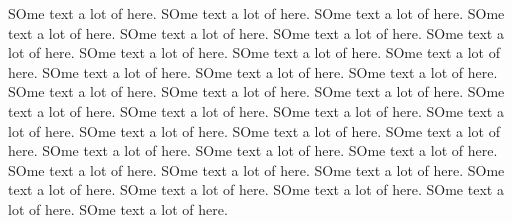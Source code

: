 \documentclass[a4paper]{article}
\begin{document}
    SOme text a lot of here.
    SOme text a lot of here.
    SOme text a lot of here.
    SOme text a lot of here.
    SOme text a lot of here.
    SOme text a lot of here.
    SOme text a lot of here.
    SOme text a lot of here.
    SOme text a lot of here.
    SOme text a lot of here.
    SOme text a lot of here.
    SOme text a lot of here.
    SOme text a lot of here.
    SOme text a lot of here.
    SOme text a lot of here.
    SOme text a lot of here.
    SOme text a lot of here.
    SOme text a lot of here.
    SOme text a lot of here.
    SOme text a lot of here.
    SOme text a lot of here.
    SOme text a lot of here.
    SOme text a lot of here.
    SOme text a lot of here.
    SOme text a lot of here.
    SOme text a lot of here.
    SOme text a lot of here.
    SOme text a lot of here.
    SOme text a lot of here.
    SOme text a lot of here.
    SOme text a lot of here.
    SOme text a lot of here.
    SOme text a lot of here.
    SOme text a lot of here.
\end{document}
